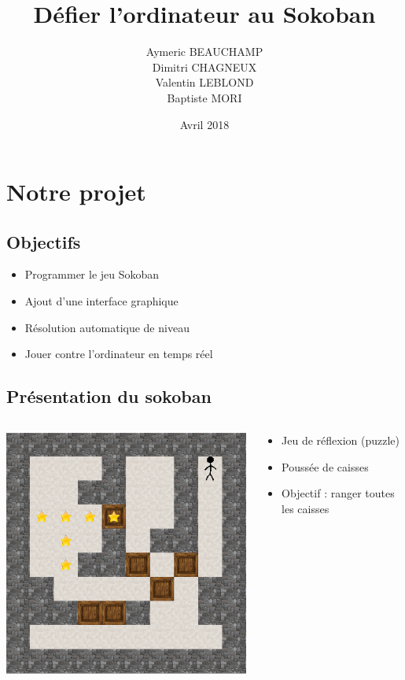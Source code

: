 \documentclass{beamer}
\title{Défier l'ordinateur au Sokoban}
\author{Aymeric BEAUCHAMP\\Dimitri CHAGNEUX\\Valentin LEBLOND\\Baptiste MORI}
\date{Avril 2018}
\begin{document}
 
\maketitle 

\frame{\tableofcontents}

\section{Notre projet}

\subsection{Objectifs}
\begin{frame}
\begin{itemize}
\item Programmer le jeu Sokoban
\item Ajout d'une interface graphique
\item Résolution automatique de niveau
\item Jouer contre l'ordinateur en temps réel
\end{itemize}
\end{frame}

\subsection{Présentation du sokoban}
\begin{frame} %
\begin{columns}
\hspace{0.5cm}
\begin{column}{5cm}
\includegraphics[scale=0.3]{images/sokoban.png}
\end{column}
\begin{column}{6cm}
\begin{itemize}
\item Jeu de réflexion (puzzle)
\item Poussée de caisses
\item Objectif : ranger toutes les caisses 
\end{itemize}
\end{column}
\end{columns}
\end{frame}
\end{document}
